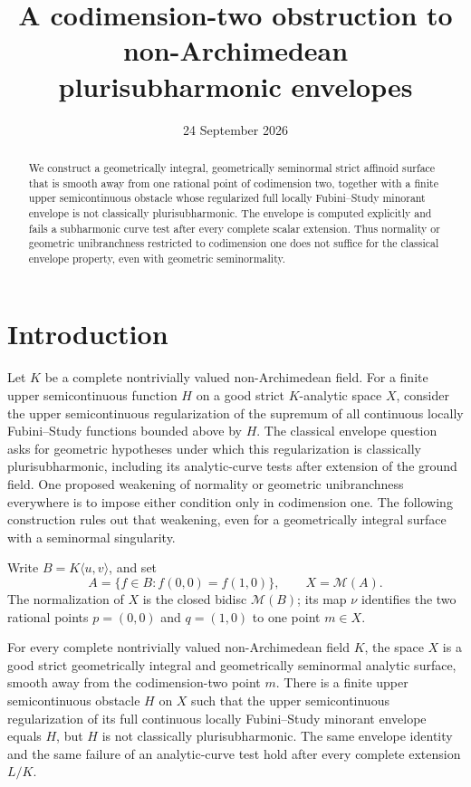 \documentclass[11pt,a4paper]{amsart}
\title[Codimension-two envelope obstruction]{A codimension-two obstruction to non-Archimedean plurisubharmonic envelopes}
\author{}
\date{24 September 2026}
\begin{document}
\begin{abstract}
We construct a geometrically integral, geometrically seminormal strict affinoid surface that is smooth away from one rational point of codimension two, together with a finite upper semicontinuous obstacle whose regularized full locally Fubini--Study minorant envelope is not classically plurisubharmonic. The envelope is computed explicitly and fails a subharmonic curve test after every complete scalar extension. Thus normality or geometric unibranchness restricted to codimension one does not suffice for the classical envelope property, even with geometric seminormality.
\end{abstract}

\maketitle

\section{Introduction}

Let $K$ be a complete nontrivially valued non-Archimedean field. For a finite upper semicontinuous function $H$ on a good strict $K$-analytic space $X$, consider the upper semicontinuous regularization of the supremum of all continuous locally Fubini--Study functions bounded above by $H$. The classical envelope question asks for geometric hypotheses under which this regularization is classically plurisubharmonic, including its analytic-curve tests after extension of the ground field. One proposed weakening of normality or geometric unibranchness everywhere is to impose either condition only in codimension one. The following construction rules out that weakening, even for a geometrically integral surface with a seminormal singularity.

Write $B=K\langle u,v\rangle$, and set
\[
 A=\{f\in B:f(0,0)=f(1,0)\},\qquad X=\mathcal M(A).
\]
The normalization of $X$ is the closed bidisc $\mathcal M(B)$; its map $\nu$ identifies the two rational points $p=(0,0)$ and $q=(1,0)$ to one point $m\in X$.

\begin{maintheorem}\label{thm:codimension-two-envelope}
For every complete nontrivially valued non-Archimedean field $K$, the space $X$ is a good strict geometrically integral and geometrically seminormal analytic surface, smooth away from the codimension-two point $m$. There is a finite upper semicontinuous obstacle $H$ on $X$ such that the upper semicontinuous regularization of its full continuous locally Fubini--Study minorant envelope equals $H$, but $H$ is not classically plurisubharmonic. The same envelope identity and the same failure of an analytic-curve test hold after every complete extension $L/K$.
\end{maintheorem}
\end{document}
